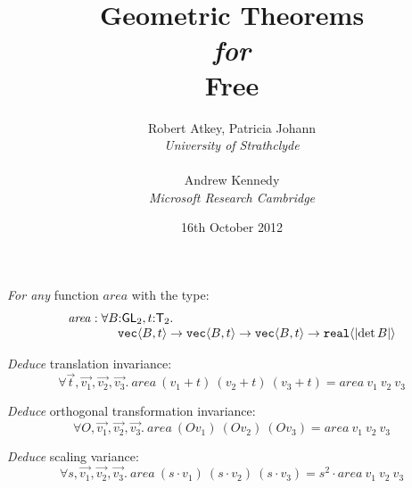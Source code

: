 \documentclass[xetex,serif,mathserif]{beamer}
\title{Geometric Theorems \\ \emph{for} \\ Free}
\author{Robert Atkey, Patricia Johann \\ \textit{University of Strathclyde} \\~ \\ Andrew Kennedy \\ \textit{Microsoft Research Cambridge}}
\date{16th October 2012}
\newcommand{\abs}[1]{\lvert #1 \rvert}
\newcommand{\SynGL}[1]{\mathsf{GL}_#1}
\newcommand{\SynTransl}[1]{\mathsf{T}_#1}
\newcommand{\tyPrim}[2]{\textup{\texttt{#1}}\langle #2 \rangle}
\newenvironment{slide}[1]{\begin{frame}\frametitle{#1}}{\end{frame}}
\begin{document}
\frame{\titlepage}

\begin{slide}{}
  \textcolor{titlered}{\emph{For any}} function $\mathit{area}$ with the type:
  \begin{displaymath}
    \begin{array}[t]{l}
      \mathit{area} : \forall B \mathord: \SynGL{2}, t \mathord: \SynTransl{2}.\\
      \quad\quad\quad\quad\tyPrim{vec}{B,t} \to \tyPrim{vec}{B,t} \to \tyPrim{vec}{B,t} \to \tyPrim{real}{\abs{\det B}}
    \end{array}
  \end{displaymath}

  \bigskip
  \pause

  \textcolor{titlered}{\emph{Deduce}} translation invariance:
  \begin{displaymath}
    \forall \vec{t}, \vec{v_1}, \vec{v_2}, \vec{v_3}.~\mathit{area}~(v_1 + t)~(v_2 + t)~(v_3 + t) = \mathit{area}~v_1~v_2~v_3
  \end{displaymath}

  \bigskip
  \pause

  \textcolor{titlered}{\emph{Deduce}} orthogonal transformation invariance:
  \begin{displaymath}
    \forall O, \vec{v_1}, \vec{v_2}, \vec{v_3}.~\mathit{area}~(Ov_1)~(Ov_2)~(Ov_3) = \mathit{area}~v_1~v_2~v_3
  \end{displaymath}

  \bigskip
  \pause

  \textcolor{titlered}{\emph{Deduce}} scaling variance:
  \begin{displaymath}
    \forall s, \vec{v_1}, \vec{v_2}, \vec{v_3}.~\mathit{area}~(s \cdot v_1)~(s \cdot v_2)~(s \cdot v_3) = s^2 \cdot \mathit{area}~v_1~v_2~v_3
  \end{displaymath}
\end{slide}
\end{document}
